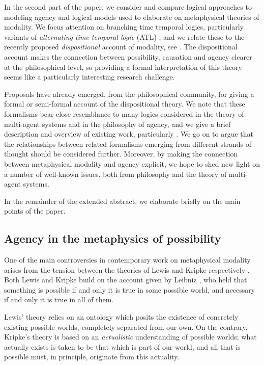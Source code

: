\documentclass{article}
\begin{document}
In the second part of the paper, we consider and compare logical approaches to modeling agency and logical models used to elaborate on metaphysical theories of modality. We focus attention on branching time temporal logics, particularly variants of \emph{alternating time temporal logic} (ATL) \cite{atl}, and we relate these to the recently proposed \emph{dispositional} account of modality, see \cite{dispmod,MwPw}. The dispositional account makes the connection between possibility, causation and agency clearer at the philosophical level, so providing a formal interpretation of this theory seems like a particularly interesting research challenge.

Proposals have already emerged, from the philosophical community, for giving a formal or semi-formal account of the dispositional theory. We note that these formalisms bear close resemblance to many logics considered in the theory of multi-agent systems and in the philosophy of agency, and we give a brief description and overview of existing work, particularly \cite{powmod,PhDpos}. We go on to argue that the relationships between related formalisms emerging from different strands of thought should be considered further. Moreover, by making the connection between metaphysical modality and agency explicit, we hope to shed new light on a number of well-known issues, both from philosophy and the theory of multi-agent systems.

In the remainder of the extended abstract, we elaborate briefly on the main points of the paper.

\subsection*{Agency in the metaphysics of possibility}

One of the main controversies in contemporary work on metaphysical modality arises from the tension between the theories of Lewis and Kripke respectively \cite{KripkeNN,KripkeIN,LewisPW,LewisCPB}. Both Lewis and Kripke build on the account given by Leibniz \cite{Theodicy}, who held that something is possible if and only it is true in some possible world, and necessary if and only it is true in all of them.

Lewis' theory relies on an ontology which posits the existence of concretely existing possible worlds, completely separated from our own. On the contrary, Kripke's theory is based on an \emph{actualistic} understanding of possible worlds; what actually exists is taken to be that which is part of our world, and all that is possible must, in principle, originate from this actuality.
\end{document}
